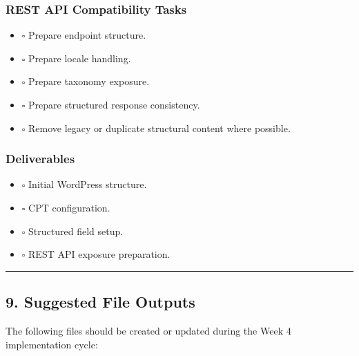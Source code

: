 \documentclass[12pt,a4paper]{article}
\providecommand{\tightlist}{\setlength{\itemsep}{0pt}\setlength{\parskip}{0pt}}
\begin{document}
\subsubsection{REST API Compatibility Tasks}\label{rest-api-compatibility-tasks}

\begin{itemize}
\tightlist
\item
  \(\square\) Prepare endpoint structure.
\item
  \(\square\) Prepare locale handling.
\item
  \(\square\) Prepare taxonomy exposure.
\item
  \(\square\) Prepare structured response consistency.
\item
  \(\square\) Remove legacy or duplicate structural content where possible.
\end{itemize}

\subsubsection{Deliverables}\label{deliverables-4}

\begin{itemize}
\tightlist
\item
  \(\square\) Initial WordPress structure.
\item
  \(\square\) CPT configuration.
\item
  \(\square\) Structured field setup.
\item
  \(\square\) REST API exposure preparation.
\end{itemize}

\begin{center}\rule{0.5\linewidth}{0.5pt}\end{center}

\subsection{9. Suggested File Outputs}\label{suggested-file-outputs}

The following files should be created or updated during the Week 4 implementation cycle:
\end{document}
